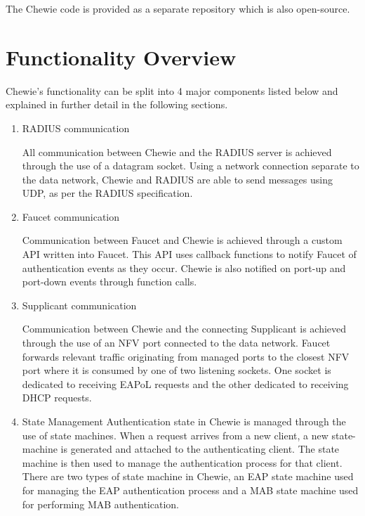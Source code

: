The Chewie code is provided as a separate repository\cite{chewie_github} which is also open-source.

\section{Functionality Overview}
Chewie's functionality can be split into 4 major components listed below and explained in further detail in the following sections.

\begin{enumerate}
    \item RADIUS communication
    
    All communication between Chewie and the RADIUS server is achieved through the use of a datagram socket. Using a network connection separate to the data network, Chewie and RADIUS are able to send messages using UDP, as per the RADIUS specification. \cite{radius_why_udp}
    
    \item Faucet communication
    
    Communication between Faucet and Chewie is achieved through a custom API written into Faucet. This API uses callback functions to notify Faucet of authentication events as they occur. Chewie is also notified on port-up and port-down events through function calls. \cite{faucet_dot1x_docs}

    \item Supplicant communication
    
    Communication between Chewie and the connecting Supplicant is achieved through the use of an NFV port connected to the data network. Faucet forwards relevant traffic originating from managed ports to the closest NFV port where it is consumed by one of two  listening sockets. One socket is dedicated to receiving EAPoL requests and the other dedicated to receiving DHCP requests.
    
    \item State Management
    Authentication state in Chewie is managed through the use of state machines. When a request arrives from a new client, a new state-machine is generated and attached to the authenticating client. The state machine is then used to manage the authentication process for that client. There are two types of state machine in Chewie, an EAP state machine used for managing the EAP authentication process and a MAB state machine used for performing MAB authentication.
\end{enumerate}

